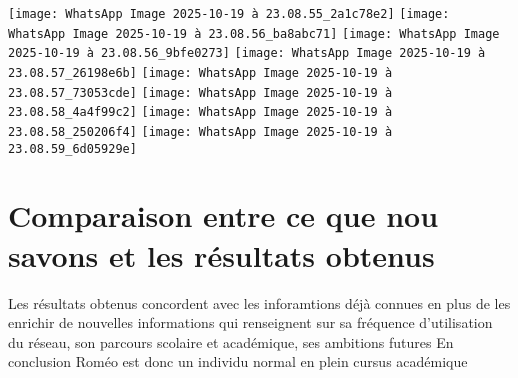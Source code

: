 \documentclass[french]{article}
\begin{document}
  
  \texttt{[image: WhatsApp Image 2025-10-19 à 23.08.55\_2a1c78e2]}
  \newline
  \texttt{[image: WhatsApp Image 2025-10-19 à 23.08.56\_ba8abc71]} \newline
  \texttt{[image: WhatsApp Image 2025-10-19 à 23.08.56\_9bfe0273]} \newline
  \texttt{[image: WhatsApp Image 2025-10-19 à 23.08.57\_26198e6b]} \newline
\texttt{[image: WhatsApp Image 2025-10-19 à 23.08.57\_73053cde]} \newline
 \texttt{[image: WhatsApp Image 2025-10-19 à 23.08.58\_4a4f99c2]} \newline
 \texttt{[image: WhatsApp Image 2025-10-19 à 23.08.58\_250206f4]} \newline
 \texttt{[image: WhatsApp Image 2025-10-19 à 23.08.59\_6d05929e]}

 \section{Comparaison entre ce que nou savons et les résultats obtenus}  

Les résultats obtenus concordent avec les inforamtions déjà connues en plus de les enrichir de nouvelles informations qui renseignent sur sa fréquence d'utilisation du réseau, son parcours scolaire et académique, ses ambitions futures \newline
En conclusion Roméo est donc un individu normal en plein cursus 	académique
\end{document}
